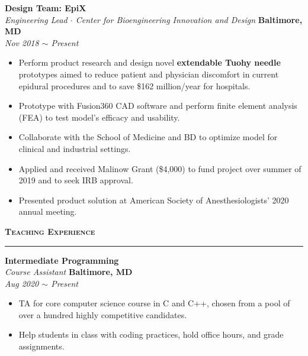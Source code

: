 \documentclass[10pt, letterpaper]{article}
\begin{document}
\begin{paracol}{2}
	\textbf{Design Team: EpiX}\\
	\textit{Engineering Lead $\cdot$ Center for Bioengineering Innovation and Design}
	\switchcolumn
	\raggedleft\textbf{Baltimore, MD}\\
	\raggedleft\textit{Nov 2018 $\sim$ Present}
\end{paracol}
\vspace{-5mm}
\begin{itemize}
	\item Perform product research and design novel \textbf{extendable Tuohy needle} 
	prototypes aimed to reduce patient and 
	physician discomfort in current epidural procedures and to save \$162 million/year for 
	hospitals.\vspace{-3mm}
	\item Prototype with Fusion360 CAD software and perform finite
	element analysis (FEA) to test model's efficacy and usability.\vspace{-3mm}
	\item Collaborate with the School of Medicine and BD to optimize
	model for clinical and industrial settings.\vspace{-3mm}
	\item Applied and received Malinow Grant (\$4,000) to fund project over 
	summer of 2019 and to seek IRB approval.\vspace{-3mm}
	\item Presented product solution at American Society of Anesthesiologists' 2020 annual meeting. 
\end{itemize}
\vspace{-3mm} 


{\large \textbf{\textsc{Teaching Experience}}}
\vspace{5pt}
\hrule
\begin{paracol}{2}
	\textbf{Intermediate Programming}\\
	\textit{Course Assistant}
	\switchcolumn
	\raggedleft\textbf{Baltimore, MD}\\
	\raggedleft\textit{Aug 2020 $\sim$ Present}
\end{paracol}
\vspace{-5mm}
\begin{itemize}
	\item TA for core computer science course in C and C++, chosen from a pool of over a hundred highly competitive candidates.\vspace{-3mm}
	\item Help students in class with coding practices, hold office hours, and grade assignments.
\end{itemize}
\vspace{-3mm}
\end{document}
